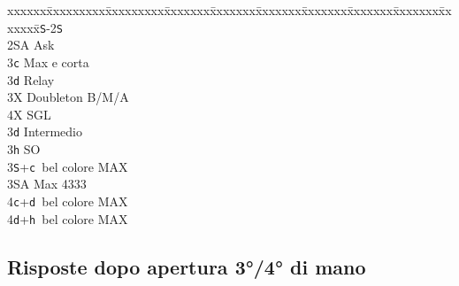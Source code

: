 \documentclass[a4paper,italian]{article}
\newcommand{\BS}{\small{\texttt{S}}}
\newcommand{\BC}{\small{\texttt{c}}}
\newcommand{\BD}{\small{\texttt{d}}}
\newcommand{\BH}{\small{\texttt{h}}}
\newenvironment{bidtable}
{\begin{tabbing}

    xxxxxx\=xxxxxxxxx\=xxxxxxxxx\=xxxxxxx\=xxxxxxx\=xxxxxxx\=xxxxxxx\=xxxxxxx\=xxxxxxx\=xxxxxxx\=\kill}
{\end{tabbing} }%
\begin{document}
\begin{multicols}{2}
    \begin{bidtable}
        1\BS-2\BS\+\\
        2\small{SA} \> Ask\+\\
        3\BC \> Max e corta\+\\
        3\BD \> Relay\+\\
        3X \> Doubleton B/M/A\\
        4X \> SGL\-\-\\
        3\BD \> Intermedio\\
        3\BH \> SO\\
        3\BS {}+\BC\ bel colore MAX\\
        3\small{SA} \> Max 4333\\
        4\BC {}+\BD\ bel colore MAX\\
        4\BD {}+\BH\ bel colore MAX\-\-
    \end{bidtable}
    \columnbreak

    \subsection{Risposte dopo apertura 3°/4° di mano}


\end{multicols}
\end{document}
